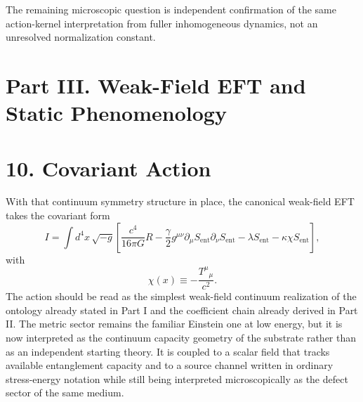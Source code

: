 \documentclass[11pt]{article}
\begin{document}
The remaining microscopic question is independent confirmation of the same action-kernel interpretation from fuller inhomogeneous dynamics, not an unresolved normalization constant.
\section*{Part III. Weak-Field EFT and Static Phenomenology}

\section{10. Covariant Action}

With that continuum symmetry structure in place, the canonical weak-field EFT takes the covariant form
\[
I = \int d^4x\,\sqrt{-g}\left[
\frac{c^4}{16\pi G}R
-\frac{\gamma}{2}g^{\mu\nu}\partial_\mu S_{\mathrm{ent}}\partial_\nu S_{\mathrm{ent}}
-\lambda S_{\mathrm{ent}}
-\kappa\chi S_{\mathrm{ent}}
\right],
\]
with
\[
\chi(x)\equiv -\frac{T^\mu{}_\mu}{c^2}.
\]
The action should be read as the simplest weak-field continuum realization of the ontology already stated in Part I and the coefficient chain already derived in Part II. The metric sector remains the familiar Einstein one at low energy, but it is now interpreted as the continuum capacity geometry of the substrate rather than as an independent starting theory. It is coupled to a scalar field that tracks available entanglement capacity and to a source channel written in ordinary stress-energy notation while still being interpreted microscopically as the defect sector of the same medium.
\end{document}
